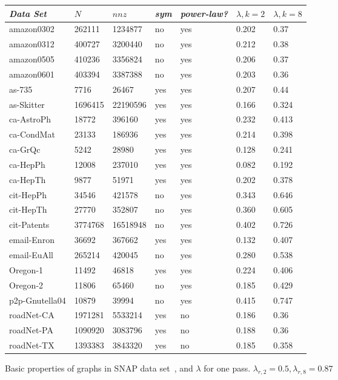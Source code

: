 \documentclass[11pt]{article}
\begin{document}
\begin{figure}
\caption{Basic properties of graphs in SNAP data set~\cite{Leskovec-data}, and $\lambda$ for one pass. $\lambda_{r,2}=0.5,\lambda_{r,8}=0.87$}
\centering
{ \begin{tabular}{ *7l }    \toprule
\label{table:big}
\emph{Data Set} & $N$ & $nnz$ & \emph{sym} & \emph{power-law?} & $\lambda, k=2$ & $\lambda, k=8$ \\\midrule 
amazon0302 & 262111 & 1234877 & no & yes & 0.202&0.37\\ 
amazon0312 & 400727 & 3200440 & no & yes & 0.212&0.38\\ 
amazon0505 & 410236 & 3356824 & no & yes & 0.206&0.37\\ 
amazon0601 & 403394 & 3387388 & no & yes & 0.203&0.36\\ 
as-735 & 7716 & 26467 & yes & yes & 0.207&0.44\\ 
as-Skitter & 1696415 & 22190596 & yes & yes & 0.166&0.324\\ 
ca-AstroPh & 18772 & 396160 & yes & yes & 0.232&0.413\\ 
ca-CondMat & 23133 & 186936 & yes & yes & 0.214&0.398\\ 
ca-GrQc & 5242 & 28980 & yes & yes & 0.128&0.241\\ 
ca-HepPh & 12008 & 237010 & yes & yes & 0.082&0.192\\ 
ca-HepTh & 9877 & 51971 & yes & yes & 0.202&0.378\\ 
cit-HepPh & 34546 & 421578 & no & yes & 0.343&0.646\\ 
cit-HepTh & 27770 & 352807 & no & yes & 0.360&0.605\\ 
cit-Patents & 3774768 & 16518948 & no & yes & 0.402&0.726\\ 
email-Enron & 36692 & 367662 & yes & yes & 0.132&0.407\\ 
email-EuAll & 265214 & 420045 & no & yes & 0.280&0.538\\ 
Oregon-1 & 11492 & 46818 & yes & yes & 0.224&0.406\\ 
Oregon-2 & 11806 & 65460 & no & yes & 0.185&0.429\\ 
p2p-Gnutella04 & 10879 & 39994 & no & yes & 0.415&0.747\\ 
roadNet-CA & 1971281 & 5533214 & yes & no & 0.186&0.36\\ 
roadNet-PA & 1090920 & 3083796 & yes & no & 0.188&0.36\\ 
roadNet-TX & 1393383 & 3843320 & yes & no & 0.185&0.358\\ 

\end{tabular}}
\end{figure}
\end{document}
